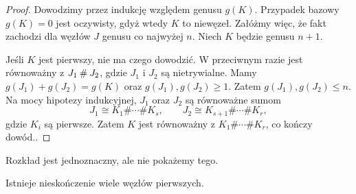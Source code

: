 \begin{proof}
    Dowodzimy przez indukcję względem genusu $g(K)$.
    Przypadek bazowy $g(K) = 0$ jest oczywisty, gdyż wtedy $K$ to niewęzeł.
    Załóżmy więc, że fakt zachodzi dla węzłów $J$ genusu co najwyżej $n$.
    Niech $K$ będzie genusu $n + 1$.

    Jeśli $K$ jest pierwszy, nie ma czego dowodzić.
    W przeciwnym razie jest równoważny z $J_1 \mathbin{\#} J_2$, gdzie $J_1$ i $J_2$ są nietrywialne.
    Mamy $g(J_1)+g(J_2)=g(K)$ oraz $g(J_1),g(J_2)\geqslant 1$.
    Zatem $g(J_1),g(J_2)\leqslant n$.
    Na mocy hipotezy indukcyjnej, $J_1$ oraz $J_2$ są równoważne sumom
    \[
        J_1 \cong K_1\#\cdots\# K_s,\qquad
        J_2 \cong K_{s+1}\#\cdots\# K_r,
    \]
    gdzie $K_i$ są pierwsze.
    Zatem $K$ jest równoważny z $K_1\#\cdots\# K_r$, co kończy dowód..
\end{proof}

Rozkład jest jednoznaczny, ale nie pokażemy tego.

\begin{proposition} \label{infty_primes}
Istnieje nieskończenie wiele węzłów pierwszych.
\end{proposition}

